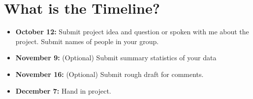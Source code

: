 \documentclass[10pt,letterpaper]{article}
\begin{document}
\section{What is the Timeline?}
\begin{itemize}
\item \textbf{October 12:} Submit project idea and question or spoken with me about the project. Submit names of people in your group.

\item \textbf{November 9:} (Optional) Submit summary statistics of your data

\item \textbf{November 16:} (Optional) Submit rough draft for comments.

\item \textbf{December 7:} Hand in project.
\end{itemize}
\end{document}
